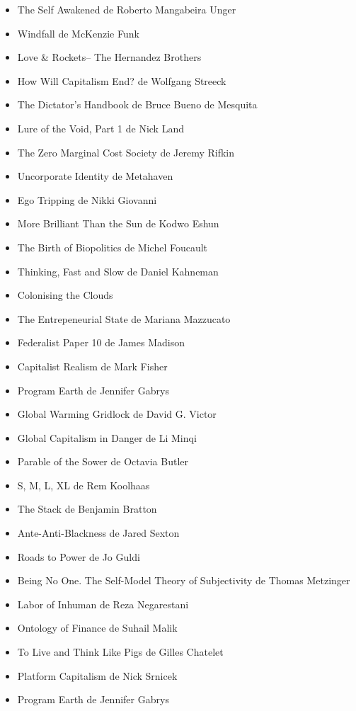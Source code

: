 \begin{itemize}
  \item The Self Awakened de Roberto Mangabeira Unger
  \item Windfall de McKenzie Funk
  \item Love \& Rockets-- The Hernandez Brothers
  \item How Will Capitalism End? de Wolfgang Streeck
  \item The Dictator's Handbook de Bruce Bueno de Mesquita
  \item Lure of the Void, Part 1 de Nick Land
  \item The Zero Marginal Cost Society de Jeremy Rifkin
  \item Uncorporate Identity de Metahaven
  \item Ego Tripping de Nikki Giovanni
  \item More Brilliant Than the Sun de Kodwo Eshun
  \item The Birth of Biopolitics de Michel Foucault
  \item Thinking, Fast and Slow de Daniel Kahneman
  \item Colonising the Clouds
  \item The Entrepeneurial State de Mariana Mazzucato
  \item Federalist Paper 10 de James Madison
  \item Capitalist Realism de Mark Fisher
  \item Program Earth de Jennifer Gabrys
  \item Global Warming Gridlock de David G. Victor
  \item Global Capitalism in Danger de Li Minqi
  \item Parable of the Sower de Octavia Butler
  \item S, M, L, XL de Rem Koolhaas
  \item The Stack de Benjamin Bratton
  \item Ante-Anti-Blackness de Jared Sexton
  \item Roads to Power de Jo Guldi
  \item Being No One. The Self-Model Theory of Subjectivity de Thomas Metzinger
  \item Labor of Inhuman de Reza Negarestani
  \item Ontology of Finance de Suhail Malik
  \item To Live and Think Like Pigs de Gilles Chatelet
  \item Platform Capitalism de Nick Srnicek
  \item Program Earth de Jennifer Gabrys

\end{itemize}

